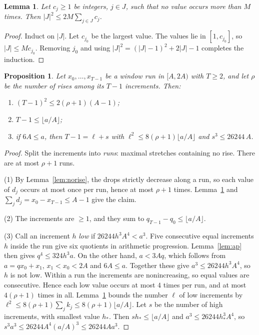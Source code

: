 \documentclass[11pt]{amsart}
\newtheorem{lemma}[theorem]{Lemma}
\newtheorem{proposition}[theorem]{Proposition}
\theoremstyle{definition}
\theoremstyle{remark}
\begin{document}
\begin{lemma}\label{lem:mult}
Let $c_j\ge1$ be integers, $j\in J$, such that no value occurs more than $M$ times. Then
$|J|^2\le 2M\sum_{j\in J}c_j$.
\end{lemma}

\begin{proof}
Induct on $|J|$. Let $c_{j_0}$ be the largest value. The values lie in $[1,c_{j_0}]$, so
$|J|\le Mc_{j_0}$. Removing $j_0$ and using $|J|^2=(|J|-1)^2+2|J|-1$ completes the induction.
\end{proof}

\begin{proposition}\label{prop:rises}
Let $x_0,\dots,x_{T-1}$ be a window run in $[A,2A)$ with $T\ge2$, and let $\rho$ be the number
of rises among its $T-1$ increments. Then:
\begin{enumerate}
\item $(T-1)^2\le 2(\rho+1)(A-1)$;
\item $T-1\le\lfloor a/A\rfloor$;
\item if $6A\le a$, then $T-1=\ell+s$ with $\ell^2\le 8(\rho+1)\lfloor a/A\rfloor$ and
$s^3\le 26244\,A$.
\end{enumerate}
\end{proposition}

\begin{proof}
Split the increments into \emph{runs}: maximal stretches containing no rise. There are at most
$\rho+1$ runs.

(1) By Lemma~\ref{lem:norise}, the drops strictly decrease along a run, so each value of $d_j$
occurs at most once per run, hence at most $\rho+1$ times. Lemma~\ref{lem:mult} and
$\sum_jd_j=x_0-x_{T-1}\le A-1$ give the claim.

(2) The increments are $\ge1$, and they sum to $q_{T-1}-q_0\le\lfloor a/A\rfloor$.

(3) Call an increment $h$ \emph{low} if $26244h^3A^4<a^3$. Five consecutive equal increments
$h$ inside the run give six quotients in arithmetic progression. Lemma~\ref{lem:ap} then
gives $q^4\le324h^3a$. On the other hand, $a<3Aq$, which follows from $a=qx_0+x_1$,
$x_1<x_0<2A$ and $6A\le a$. Together these give $a^3\le26244h^3A^4$, so $h$ is not low.
Within a run the increments are nonincreasing, so equal values are consecutive. Hence each
low value occurs at most $4$ times per run, and at most $4(\rho+1)$ times in all.
Lemma~\ref{lem:mult} bounds the number $\ell$ of low increments by
$\ell^2\le8(\rho+1)\sum_jk_j\le8(\rho+1)\lfloor a/A\rfloor$. Let $s$ be the number of high
increments, with smallest value $h_*$. Then $sh_*\le\lfloor a/A\rfloor$ and
$a^3\le26244h_*^3A^4$, so $s^3a^3\le26244A^4(a/A)^3\le26244Aa^3$.
\end{proof}
\end{document}
